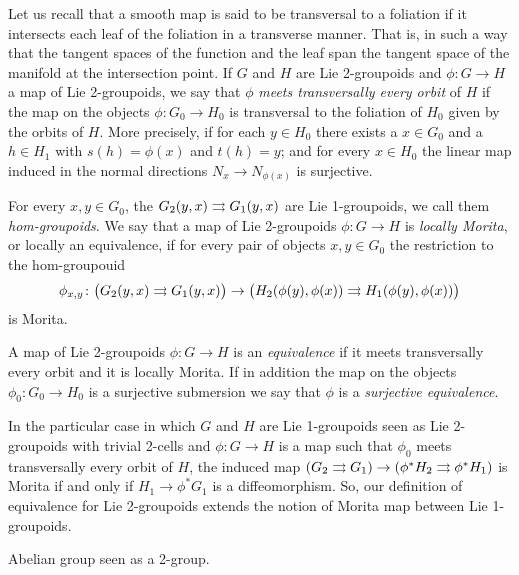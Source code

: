 Let us recall that a smooth map is said to be transversal to a foliation if it intersects each leaf of the foliation in a transverse manner. That is, in such a way that the tangent spaces of the function and the leaf span the tangent space of the manifold at the intersection point.
If $G$ and $H$ are Lie 2-groupoids and $\phi\colon G\to H$ a map of Lie 2-groupoids, we say that $\phi$ \emph{meets transversally every orbit} of $H$ if the map on the objects $\phi\colon G_0\to H_0$ is transversal to the foliation of $H_0$ given by the orbits of $H$.
More precisely, if for each $y\in H_0$ there exists a $x\in G_0$ and a $h\in H_1$ with $s(h) = \phi(x)$ and $t(h) = y$; and for every $x\in H_0$ the linear map induced in the normal directions $N_x\to N_{\phi(x)}$ is surjective.

For every $x, y\in G_0$, the $G_2(y,x)\rightrightarrows G_1(y,x)$ are Lie 1-groupoids, we call them \emph{hom-groupoids}.
We say that a map of Lie 2-groupoids $\phi\colon G\to H$ is \emph{locally Morita}, or locally an equivalence, if for every pair of objects $x, y\in G_0$ the restriction to the hom-groupouid
\[ \phi_{x,y}\colon \big( G_2(y,x)\rightrightarrows G_1(y,x) \big) \to \big( H_2(\phi(y),\phi(x))\rightrightarrows H_1(\phi(y),\phi(x)) \big) \]
is Morita.

\begin{mydef}
A map of Lie 2-groupoids $\phi\colon G\to H$ is an \emph{equivalence} if it meets transversally every orbit and it is locally Morita.
If in addition the map on the objects $\phi_0\colon G_0\to H_0$ is a surjective submersion we say that $\phi$ is a \emph{surjective equivalence}.
\end{mydef}

\begin{example}
In the particular case in which $G$ and $H$ are Lie 1-groupoids seen as Lie 2-groupoids with trivial 2-cells and $\phi: G\to H$ is a map such that $\phi_0$ meets transversally every orbit of $H$, the induced map $(G_2\rightrightarrows G_1)\to (\phi^*H_2\rightrightarrows \phi^*H_1)$ is Morita if and only if $H_1\to \phi^*G_1$ is a diffeomorphism.
So, our definition of equivalence for Lie 2-groupoids extends the notion of Morita map between Lie 1-groupoids.
\end{example}

\begin{example}
Abelian group seen as a 2-group.
\end{example}

